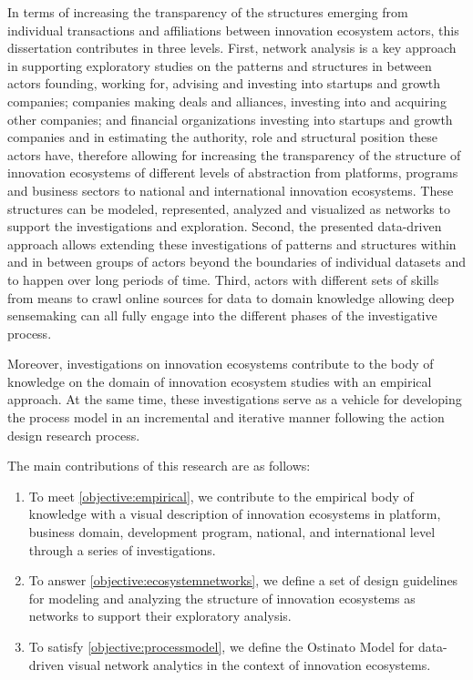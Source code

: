 In terms of increasing the transparency of the structures emerging from individual transactions and affiliations between innovation ecosystem actors, this dissertation contributes in three levels. First, network analysis is a key approach in supporting exploratory studies on the patterns and structures in between actors founding, working for, advising and investing into startups and growth companies; companies making deals and alliances, investing into and acquiring other companies; and financial organizations investing into startups and growth companies  and in estimating the authority, role and structural position these actors have, therefore allowing for increasing the transparency of the structure of innovation ecosystems of different levels of abstraction from platforms, programs and business sectors to national and international innovation ecosystems. These structures can be modeled, represented, analyzed and visualized as networks to support the investigations and exploration. Second, the presented data-driven approach allows extending these investigations of patterns and structures within and in between groups of actors beyond the boundaries of individual datasets and to happen over long periods of time. Third, actors with different sets of skills from means to crawl online sources for data to domain knowledge allowing deep sensemaking can all fully engage into the different phases of the investigative process.

Moreover, investigations on innovation ecosystems contribute to the body of knowledge on the domain of innovation ecosystem studies with an empirical approach. At the same time, these investigations serve as a vehicle for developing the process model in an incremental and iterative manner following the action design research process.
 
The main contributions of this research are as follows:

\begin{enumerate}[label=\textbf{Contribution \Roman*},align=left]
  \item To meet \ref{objective:empirical}, we contribute to the empirical body of knowledge with a visual description of innovation ecosystems in platform, business domain, development program, national, and international level through a series of investigations. 
  \label{contribution:empirical}

  \item To answer \ref{objective:ecosystemnetworks}, we define a set of design guidelines for modeling and analyzing the structure of innovation ecosystems as networks to support their exploratory analysis.
  \label{contribution:ecosystemnetworks}
   
  \item To satisfy \ref{objective:processmodel}, we define the Ostinato Model for data-driven visual network analytics in the context of innovation ecosystems.
  \label{contribution:processmodel}
\end{enumerate}

